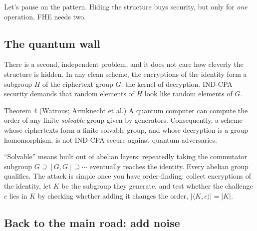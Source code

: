 \documentclass[11pt,a4paper]{article}
\newcommand{\indcpa}{\textsf{IND-CPA}}
\begin{document}
Let's pause on the pattern. Hiding the structure buys security, but only for
\emph{one} operation. FHE needs two.

\subsection{The quantum wall}

There is a second, independent problem, and it does not care how cleverly the
structure is hidden. In any clean scheme, the encryptions of the identity form
a subgroup $H$ of the ciphertext group $G$: the kernel of decryption.
\indcpa{} security demands that random elements of $H$ look like random
elements of $G$.

\begin{formal}{Theorem 4 (Watrous; Armknecht et al.)}
A quantum computer can compute the order of any finite \emph{solvable} group
given by generators. Consequently, a scheme whose ciphertexts form a finite
solvable group, and whose decryption is a group homomorphism, is not
\indcpa{} secure against quantum adversaries.
\end{formal}

\noindent
``Solvable'' means built out of abelian layers: repeatedly taking the
commutator subgroup $G\supseteq [G,G]\supseteq\cdots$ eventually reaches the
identity. Every abelian group qualifies. The attack is simple once you have
order-finding: collect encryptions of the identity, let $K$ be the subgroup
they generate, and test whether the challenge $c$ lies in $K$ by checking
whether adding it changes the order, $|\langle K,c\rangle|=|K|$.


\subsection{Back to the main road: add noise}
\end{document}
